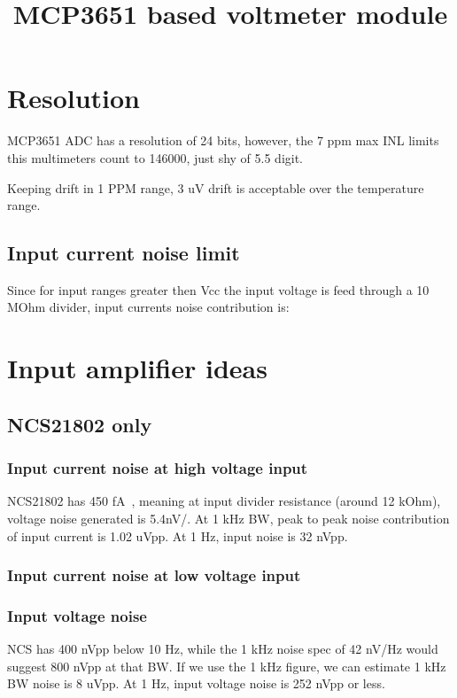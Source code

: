 \documentclass[11pt]{article}
\title{MCP3651 based voltmeter module}
\begin{document}
\maketitle
\pagebreak
\tableofcontents
\pagebreak



\section{Resolution}
MCP3651 ADC has a resolution of 24 bits, however, the 7 ppm max 
INL limits this multimeters count to 146000, just shy of 5.5 digit.

Keeping drift in 1 PPM range, 3 uV drift is acceptable over the 
temperature range.

\subsection{Input current noise limit}
Since for input ranges greater then Vcc the input voltage is feed through
a 10 MOhm divider, input currents noise contribution is:

\section{Input amplifier ideas}

\subsection{NCS21802 only}

\subsubsection{Input current noise at high voltage input}
NCS21802 has 450 \si{\femto \ampere \sqrt{\hertz}}, meaning at input divider
resistance (around 12 kOhm), voltage noise generated is 5.4\si{nV/}.
At 1 kHz BW, peak to peak noise contribution of input current is 1.02 uVpp.
At 1 Hz, input noise is 32 nVpp.

\subsubsection{Input current noise at low voltage input}

\subsubsection{Input voltage noise}
NCS has 400 nVpp below 10 Hz, while the 1 kHz noise spec of 42 nV/Hz would 
suggest 800 nVpp at that BW. If we use the 1 kHz figure, we can estimate 
1 kHz BW noise is 8 uVpp. At 1 Hz, input voltage noise is 252 nVpp or less.
\end{document}
